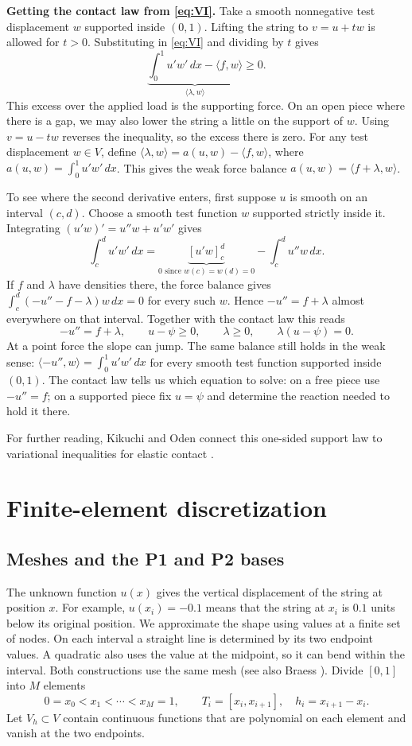 \documentclass[11pt,a4paper]{article}
\newcommand{\ip}[2]{\langle #1,#2\rangle}
\newcommand{\sect}[1]{\Needspace{7\baselineskip}\section{#1}}
\newcommand{\subsect}[1]{\Needspace{5\baselineskip}\subsection{#1}}
\begin{document}
\textbf{Getting the contact law from \eqref{eq:VI}.} Take a smooth nonnegative test displacement $w$ supported inside $(0,1)$. Lifting the string to $v=u+tw$ is allowed for $t>0$. Substituting in \eqref{eq:VI} and dividing by $t$ gives
\[
 \underbrace{\int_0^1 u'w'\,dx-\ip{f}{w}}_{\ip{\lambda}{w}}\geq0.
\]
This excess over the applied load is the supporting force. On an open piece where there is a gap, we may also lower the string a little on the support of $w$. Using $v=u-tw$ reverses the inequality, so the excess there is zero. For any test displacement $w\in V$, define $\ip{\lambda}{w}=a(u,w)-\ip{f}{w}$, where $a(u,w)=\int_0^1u'w'\,dx$. This gives the weak force balance $a(u,w)=\ip{f+\lambda}{w}$.

To see where the second derivative enters, first suppose $u$ is smooth on an interval $(c,d)$. Choose a smooth test function $w$ supported strictly inside it. Integrating $(u'w)'=u''w+u'w'$ gives
\[
 \int_c^d u'w'\,dx
 =\underbrace{[u'w]_c^d}_{0\text{ since }w(c)=w(d)=0}
  -\int_c^d u''w\,dx .
\]
If $f$ and $\lambda$ have densities there, the force balance gives $\int_c^d(-u''-f-\lambda)w\,dx=0$ for every such $w$. Hence $-u''=f+\lambda$ almost everywhere on that interval. Together with the contact law this reads
\[
 -u''=f+\lambda,\qquad u-\psi\geq0,\qquad \lambda\geq0,\qquad \lambda(u-\psi)=0 .
\]
At a point force the slope can jump. The same balance still holds in the weak sense: $\ip{-u''}{w}=\int_0^1 u'w'\,dx$ for every smooth test function supported inside $(0,1)$. The contact law tells us which equation to solve: on a free piece use $-u''=f$; on a supported piece fix $u=\psi$ and determine the reaction needed to hold it there.

For further reading, Kikuchi and Oden connect this one-sided support law to
variational inequalities for elastic contact \cite[Ch.~2]{contact}.

\sect{Finite-element discretization}\label{sec:fem}
\subsect{Meshes and the P1 and P2 bases}
The unknown function $u(x)$ gives the vertical displacement of the string at position $x$. For example, $u(x_i)=-0.1$ means that the string at $x_i$ is $0.1$ units below its original position. We approximate the shape using values at a finite set of nodes. On each interval a straight line is determined by its two endpoint values. A quadratic also uses the value at the midpoint, so it can bend within the interval.
Both constructions use the same
mesh (see also Braess \cite[Ch.~II]{braess}). Divide $[0,1]$ into $M$ elements
\[
 0=x_0<x_1<\cdots<x_M=1,\qquad T_i=[x_i,x_{i+1}],\quad h_i=x_{i+1}-x_i.
\]
Let $V_h\subset V$ contain continuous functions that are polynomial on each element and vanish at the two endpoints.
\end{document}
